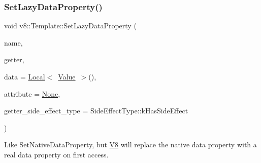 \subsubsection{\texorpdfstring{Set\+Lazy\+Data\+Property()}{SetLazyDataProperty()}}
{\footnotesize\ttfamily void v8\+::\+Template\+::\+Set\+Lazy\+Data\+Property (\begin{DoxyParamCaption}\item[{\mbox{\hyperlink{classv8_1_1Local}{Local}}$<$ \mbox{\hyperlink{classv8_1_1Name}{Name}} $>$}]{name,  }\item[{Accessor\+Name\+Getter\+Callback}]{getter,  }\item[{\mbox{\hyperlink{classv8_1_1Local}{Local}}$<$ \mbox{\hyperlink{classv8_1_1Value}{Value}} $>$}]{data = {\ttfamily \mbox{\hyperlink{classv8_1_1Local}{Local}}$<$~\mbox{\hyperlink{classv8_1_1Value}{Value}}~$>$()},  }\item[{\mbox{\hyperlink{namespacev8_a05f25f935e108a1ea2d150e274602b87}{Property\+Attribute}}}]{attribute = {\ttfamily \mbox{\hyperlink{namespacev8_a05f25f935e108a1ea2d150e274602b87a7ab4d58719c33b3ea2dfaefa29b111df}{None}}},  }\item[{\mbox{\hyperlink{namespacev8_a29711319c2b9fc7716d65faee2f7b9cb}{Side\+Effect\+Type}}}]{getter\+\_\+side\+\_\+effect\+\_\+type = {\ttfamily SideEffectType\+:\+:kHasSideEffect} }\end{DoxyParamCaption})}

Like Set\+Native\+Data\+Property, but \mbox{\hyperlink{classv8_1_1V8}{V8}} will replace the native data property with a real data property on first access. \mbox{\label{classv8_1_1Template_af6820f70079745cef28d5291ff21df29}} 
